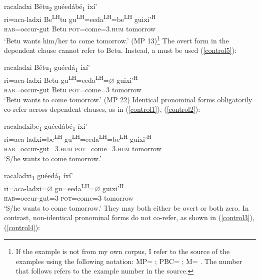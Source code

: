 \ea\label{control6}
\glll racaladxi B\v{e}tu\textsubscript{2} gu\'{e}ed\'{a}b\'{e}\textsubscript{1} \'{i}x\'{i}' \\
ri=aca-ladxi Be\textsuperscript{LH}tu gu\textsuperscript{LH}=eeda\textsuperscript{LH}=be\textsuperscript{LH}  guixi'\textsuperscript{H}  \\
\textsc{hab}=occur-gut Betu \textsc{pot}=come=\textsc{3.hum} tomorrow \\
\glt `Betu wants him/her to come tomorrow.'  \hfill{(MP 13)}\footnote{If the example is not from my own corpus, I refer to the source of the examples using the following notation: 
MP= \citet{marlett1996};
PBC= \citet{pickett1998}; 
M= \citet{marlett1993}.
The number that follows refers to the example number in the source.}
\z
The overt form in the dependent clause cannot refer to Betu. Instead, a  must be used (\ref{control5}):

\ea\label{control5}
\glll racaladxi B\v{e}tu\textsubscript{1} gu\'{e}ed\'{a}\textsubscript{1} \'{i}x\'{i}' \\
ri=aca-ladxi Betu gu\textsuperscript{LH}=eeda\textsuperscript{LH}={$\varnothing$} guixi'\textsuperscript{H}  \\
\textsc{hab}=occur-gut Betu \textsc{pot}=come=\textsc{3} tomorrow \\
\glt `Betu wants to come tomorrow.' \hfill{(MP 22)}
\z
Identical pronominal forms obligatorily co-refer across dependent clauses, as in (\ref{control1}), (\ref{control2}):

\ea\label{control1}
\glll racaladxibe\textsubscript{1} gu\'{e}ed\'{a}b\'{e}\textsubscript{1} \'{i}x\'{i}' \\
ri=aca-ladxi=be\textsuperscript{LH}  gu\textsuperscript{LH}=eeda\textsuperscript{LH}=be\textsuperscript{LH}  guixi'\textsuperscript{H}  \\
\textsc{hab}=occur-gut=\textsc{3.hum} \textsc{pot}=come=\textsc{3.hum} tomorrow \\
\glt `S/he wants to come tomorrow.'
\z

\ea\label{control2}
\glll racaladxi\textsubscript{1} gu\'{e}ed\'{a}\textsubscript{1} \'{i}x\'{i}' \\
ri=aca-ladxi={$\varnothing$} gu=eeda\textsuperscript{LH}={$\varnothing$} guixi'\textsuperscript{H}  \\
\textsc{hab}=occur-gut=\textsc{3} \textsc{pot}=come=\textsc{3} tomorrow \\
\glt `S/he wants to come tomorrow.'
\z
They may both either be overt or both zero. In contrast, non-identical pronominal forms do not co-refer, as shown in (\ref{control3}), (\ref{control4}):

